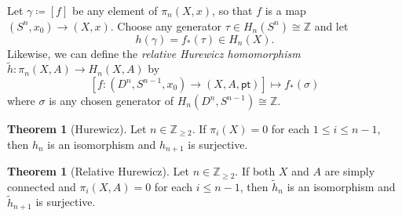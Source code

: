 \documentclass[10pt,letterpaper,cm]{nupset}
\theoremstyle{definition}
\theoremstyle{theorem}
\newtheorem{theorem}[defn]{Theorem}
\theoremstyle{remark}
\newcommand{\Z}{\mathbb Z}
\newcommand{\1}{\mathbb{1}}
\newcommand{\0}{\vec 0}
\newcommand{\pt}{\mathsf{pt}}
\begin{document}
\smallskip

Let $\gamma \coloneqq \left[f\right]$ be any element of $\pi_n(X, x)$, so that $f$ is a map $\left(S^n, x_0\right) \to \left(X, x\right)$. Choose any generator $\tau \in H_n(S^n) \cong \Z$ and let 
\[
h(\gamma) = f_{\ast}(\tau) \in H_n(X).
\]
Likewise, we can define the \textit{relative Hurewicz homomorphism} $\tilde{h} : \pi_n(X, A) \to H_n(X,A)$ by $$\left[f: \left(D^n, S^{n-1}, x_0\right) \to \left(X, A, \pt\right)\right] \mapsto f_{\ast}(\sigma)$$ where $\sigma$ is any chosen generator of $H_n(D^n, S^{n-1}) \cong \Z$. 

\begin{theorem}[Hurewicz]\label{Hur}
Let $n\in \Z_{\geq 2}$. If $\pi_i(X) =0$ for each $1\leq i \leq n-1$, then $h_n$ is an isomorphism and $h_{n+1}$ is surjective.  
\end{theorem}

\begin{theorem}[Relative Hurewicz]
Let $n\in \Z_{\geq 2}$. If both $X$ and $A$ are simply connected and $\pi_i(X, A) =0$ for each $i\leq n-1$, then $\tilde{h}_n$ is an isomorphism and $\tilde{h}_{n+1}$ is surjective.
\end{theorem}
\end{document}
